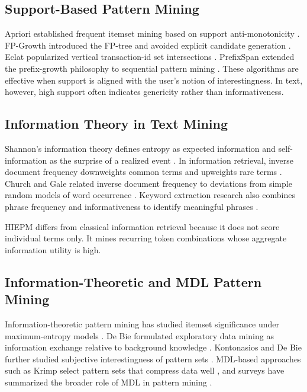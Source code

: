 \documentclass[11pt,a4paper]{article}
\begin{document}
\subsection{Support-Based Pattern Mining}

Apriori established frequent itemset mining based on support anti-monotonicity \cite{AgrawalSrikant1994}. FP-Growth introduced the FP-tree and avoided explicit candidate generation \cite{HanPeiYin2000}. Eclat popularized vertical transaction-id set intersections \cite{Zaki2000}. PrefixSpan extended the prefix-growth philosophy to sequential pattern mining \cite{Pei2001PrefixSpan}. These algorithms are effective when support is aligned with the user's notion of interestingness. In text, however, high support often indicates genericity rather than informativeness.

\subsection{Information Theory in Text Mining}

Shannon's information theory defines entropy as expected information and self-information as the surprise of a realized event \cite{Shannon1948}. In information retrieval, inverse document frequency downweights common terms and upweights rare terms \cite{ManningRaghavanSchutze2008IR}. Church and Gale related inverse document frequency to deviations from simple random models of word occurrence \cite{ChurchGale1995}. Keyword extraction research also combines phrase frequency and informativeness to identify meaningful phrases \cite{TomokiyoHurst2003}.

HIEPM differs from classical information retrieval because it does not score individual terms only. It mines recurring token combinations whose aggregate information utility is high.

\subsection{Information-Theoretic and MDL Pattern Mining}

Information-theoretic pattern mining has studied itemset significance under maximum-entropy models \cite{Tatti2008MaximumEntropy}. De Bie formulated exploratory data mining as information exchange relative to background knowledge \cite{DeBie2011SubjectiveInterestingness}. Kontonasios and De Bie further studied subjective interestingness of pattern sets \cite{Kontonasios2012SubjectiveInterestingness}. MDL-based approaches such as Krimp select pattern sets that compress data well \cite{Vreeken2011Krimp}, and surveys have summarized the broader role of MDL in pattern mining \cite{Galbrun2020MDL}.
\end{document}
